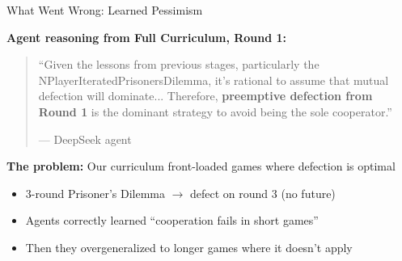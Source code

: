 \documentclass[aspectratio=169]{beamer}
\begin{document}
\begin{frame}{What Went Wrong: Learned Pessimism}
  
  \textbf{Agent reasoning from Full Curriculum, Round 1:}
  
  \vspace{0.5em}
  \begin{quote}
    \small
    ``Given the lessons from previous stages, particularly the NPlayerIteratedPrisonersDilemma, it's rational to assume that mutual defection will dominate... Therefore, \textbf{preemptive defection from Round 1} is the dominant strategy to avoid being the sole cooperator.''
    
    \hfill --- DeepSeek agent
  \end{quote}
  
  \vspace{1em}
  \textbf{The problem:} Our curriculum front-loaded games where defection is optimal
  
  \vspace{0.5em}
  \begin{itemize}
    \item 3-round Prisoner's Dilemma $\to$ defect on round 3 (no future)
    \item Agents correctly learned ``cooperation fails in short games''
    \item Then they overgeneralized to longer games where it doesn't apply
  \end{itemize}

\end{frame}
\end{document}
